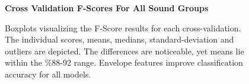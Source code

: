 \documentclass[runningheads,a4paper]{llncs}
\begin{document}
\begin{appendices}
\begin{figure}[htbp!]
    \begin{center}
    \textbf{Cross Validation F-Scores For All Sound Groups}\par\medskip
    \caption{Boxplots visualizing the F-Score results for each cross-validation. The individual scores, means, medians, standard-deviation and outliers are depicted. The differences are noticeable, yet means lie within the \%88-92 range. Envelope features improve classification accuracy for all models. }
    \label{fig:f1_allg_box}
    \end{center}
\end{figure}


\end{appendices}
\end{document}
